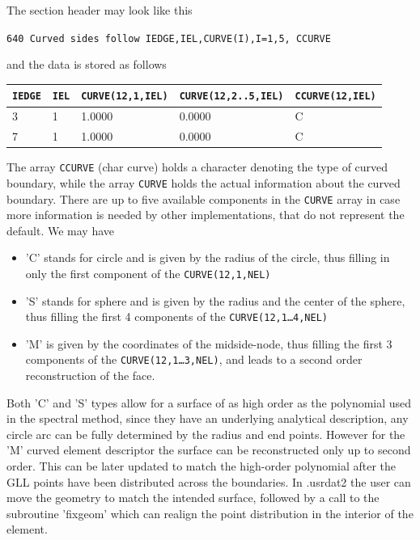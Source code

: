 \begin{description}
     The section header may look like this 
     \begin{center}
     \texttt{640 Curved sides follow IEDGE,IEL,CURVE(I),I=1,5, CCURVE} 
     \end{center}
     and the data is stored as follows
  \footnotesize   
     \begin{center}
\begin{tabular}{ l|l|l|l|l }
   \hline
 \texttt{IEDGE}& \texttt{IEL} &\texttt{CURVE(12,1,IEL)} &\texttt{CURVE(12,2..5,IEL)}&\texttt{CCURVE(12,IEL)} \\ \hline \hline
  3&  1 &  1.0000  &      0.0000 &    C \\
  7 & 1 &  1.0000  &      0.0000 &    C\\
   \hline
\end{tabular}   
\end{center}
\normalsize
     The array \texttt{CCURVE} (char curve) holds a character denoting the type of curved boundary, while the array \texttt{CURVE} holds the actual information about the curved boundary. There are up to five available components in the \texttt{CURVE} array in case more information is needed by other implementations, that do not represent the default. We may have
     \begin{itemize}
     \item 'C' stands for circle and is given by the radius of the circle, thus filling in only the first component of the \texttt{CURVE(12,1,NEL)} 
     \item 'S' stands for sphere and is given by the radius and the center of the sphere, thus filling the first 4 components of the \texttt{CURVE(12,1\ldots 4,NEL)}
     \item 'M' is given by the coordinates of the midside-node, thus filling the first 3 components of the \texttt{CURVE(12,1\ldots 3,NEL)}, and leads to a second order reconstruction of the face.
     \end{itemize}
Both 'C' and 'S' types allow for a surface of as high order as the polynomial used in the spectral method, since they have an underlying analytical description, any circle arc can be fully determined by the radius and end points. However for the 'M' curved element descriptor the surface can be reconstructed only up to second order. This can be later updated to match the high-order polynomial after the GLL points have been distributed across the boundaries. In .usrdat2 the user can move the geometry to match the intended surface, followed by a call to the subroutine 'fixgeom' which can realign the point distribution in the interior of the element.


\end{description}
